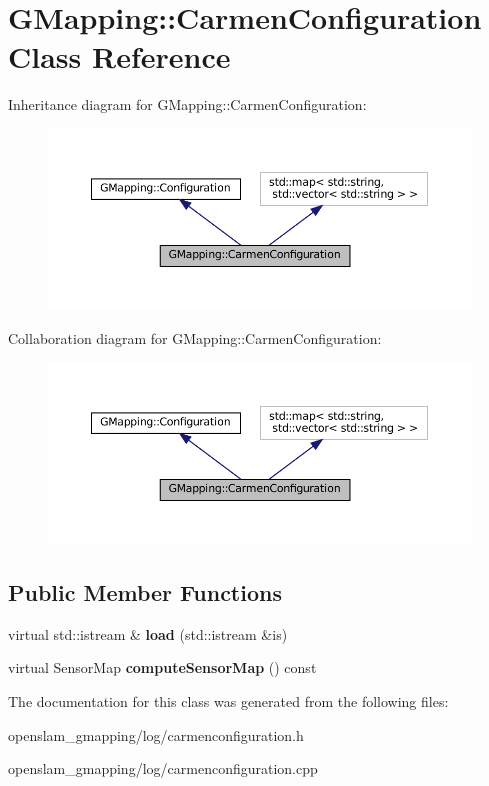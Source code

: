 \hypertarget{classGMapping_1_1CarmenConfiguration}{}\section{G\+Mapping\+:\+:Carmen\+Configuration Class Reference}
\label{classGMapping_1_1CarmenConfiguration}


Inheritance diagram for G\+Mapping\+:\+:Carmen\+Configuration\+:
\nopagebreak
\begin{figure}[H]
\begin{center}
\leavevmode
\includegraphics[width=350pt]{classGMapping_1_1CarmenConfiguration__inherit__graph}
\end{center}
\end{figure}


Collaboration diagram for G\+Mapping\+:\+:Carmen\+Configuration\+:
\nopagebreak
\begin{figure}[H]
\begin{center}
\leavevmode
\includegraphics[width=350pt]{classGMapping_1_1CarmenConfiguration__coll__graph}
\end{center}
\end{figure}
\subsection*{Public Member Functions}
\begin{DoxyCompactItemize}
\item 
\mbox{\label{classGMapping_1_1CarmenConfiguration_a98db8afaef3c38fd205807d72d6e5622}} 
virtual std\+::istream \& {\bfseries load} (std\+::istream \&is)
\item 
\mbox{\label{classGMapping_1_1CarmenConfiguration_a7852e1ded62531ea3e6b8bdb8fd80c98}} 
virtual Sensor\+Map {\bfseries compute\+Sensor\+Map} () const
\end{DoxyCompactItemize}


The documentation for this class was generated from the following files\+:\begin{DoxyCompactItemize}
\item 
openslam\+\_\+gmapping/log/carmenconfiguration.\+h\item 
openslam\+\_\+gmapping/log/carmenconfiguration.\+cpp\end{DoxyCompactItemize}
